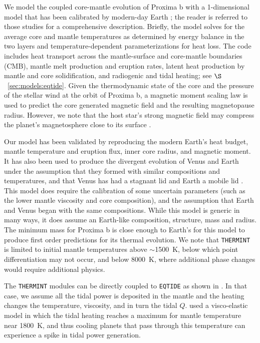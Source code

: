 \documentclass[preprint,12pt]{aastex}
\def\eqtide{\texttt{\footnotesize{EQTIDE}}\xspace}
\def\thermint{\texttt{\footnotesize{THERMINT}}\xspace}
\begin{document}
We model the coupled core-mantle evolution of Proxima b with a
1-dimensional model that has been calibrated by modern-day Earth
\citep{DriscollBercovici14,DriscollBarnes15}; the
reader is referred to those studies for a comprehensive description. 
Briefly, the model solves for the average core and mantle
temperatures as determined by energy balance in the two layers and 
temperature-dependent parameterizations for heat loss. The code
includes heat transport across the mantle-surface and core-mantle boundaries (CMB),
mantle melt production and eruption
rates, latent heat production by mantle and core solidification, and radiogenic and tidal heating;
see $\S$~\ref{sec:models:eqtide}. Given the thermodynamic state of the core and the pressure of 
the stellar wind at the orbit of Proxima b, a magnetic moment scaling law is used to predict the core 
generated magnetic field and the resulting magnetopause radius.
However, we note that the host star's strong magnetic field may compress the planet's magnetosphere close to 
its surface \citep{Vidotto13,Cohen14}.

Our model has been validated by reproducing the modern Earth's heat budget, 
mantle temperature and eruption flux, inner core radius, and magnetic moment. It
has also been used to produce the divergent evolution
of Venus and Earth under the assumption that they formed with similar compositions 
and temperatures, and that Venus has had a stagnant lid and Earth a mobile 
lid \citep{DriscollBercovici14}. This model does require the calibration of
some uncertain parameters (such as the lower mantle viscosity and core composition), 
and the assumption that Earth and Venus began with the same compositions. While
this model is generic in many ways, it does assume an Earth-like composition, structure, mass and
radius. The minimum mass for Proxima b is close enough to
Earth's for this model to produce first order predictions for its thermal evolution.  We note that
 \thermint is limited to initial mantle temperatures above $\sim$1500~K, below which point
differentiation may not occur, and below 8000~K, where additional phase changes
 would require additional physics.

The \thermint modules can be directly coupled to \eqtide as shown in
\cite{DriscollBarnes15}. In that case, we assume all the tidal power
is deposited in the mantle and the heating changes the temperature, viscosity, and
in turn the tidal $Q$. \cite{DriscollBarnes15} used a visco-elastic
model in which the tidal heating reaches a maximum for mantle
temperature near 1800~K, and thus cooling planets that pass
through this temperature can experience a spike in tidal power
generation.
\end{document}
